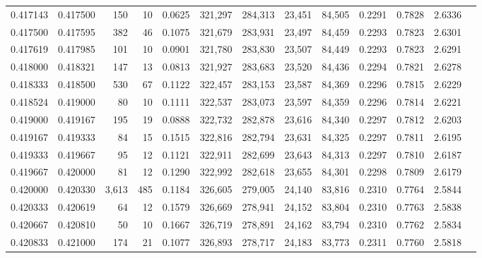 \begin{tabular}{rrrrrrrrrrrrr}
0.417143 & 0.417500 &   150 &  10 &                                     0.0625 & 321,297 & 284,313 &  23,451 &  84,505 & 0.2291 & 0.7828 & 2.6336 \\
0.417500 & 0.417595 &   382 &  46 &                                     0.1075 & 321,679 & 283,931 &  23,497 &  84,459 & 0.2293 & 0.7823 & 2.6301 \\
0.417619 & 0.417985 &   101 &  10 &                                     0.0901 & 321,780 & 283,830 &  23,507 &  84,449 & 0.2293 & 0.7823 & 2.6291 \\
0.418000 & 0.418321 &   147 &  13 &                                     0.0813 & 321,927 & 283,683 &  23,520 &  84,436 & 0.2294 & 0.7821 & 2.6278 \\
0.418333 & 0.418500 &   530 &  67 &                                     0.1122 & 322,457 & 283,153 &  23,587 &  84,369 & 0.2296 & 0.7815 & 2.6229 \\
0.418524 & 0.419000 &    80 &  10 &                                     0.1111 & 322,537 & 283,073 &  23,597 &  84,359 & 0.2296 & 0.7814 & 2.6221 \\
0.419000 & 0.419167 &   195 &  19 &                                     0.0888 & 322,732 & 282,878 &  23,616 &  84,340 & 0.2297 & 0.7812 & 2.6203 \\
0.419167 & 0.419333 &    84 &  15 &                                     0.1515 & 322,816 & 282,794 &  23,631 &  84,325 & 0.2297 & 0.7811 & 2.6195 \\
0.419333 & 0.419667 &    95 &  12 &                                     0.1121 & 322,911 & 282,699 &  23,643 &  84,313 & 0.2297 & 0.7810 & 2.6187 \\
0.419667 & 0.420000 &    81 &  12 &                                     0.1290 & 322,992 & 282,618 &  23,655 &  84,301 & 0.2298 & 0.7809 & 2.6179 \\
0.420000 & 0.420330 & 3,613 & 485 &                                     0.1184 & 326,605 & 279,005 &  24,140 &  83,816 & 0.2310 & 0.7764 & 2.5844 \\
0.420333 & 0.420619 &    64 &  12 &                                     0.1579 & 326,669 & 278,941 &  24,152 &  83,804 & 0.2310 & 0.7763 & 2.5838 \\
0.420667 & 0.420810 &    50 &  10 &                                     0.1667 & 326,719 & 278,891 &  24,162 &  83,794 & 0.2310 & 0.7762 & 2.5834 \\
0.420833 & 0.421000 &   174 &  21 &                                     0.1077 & 326,893 & 278,717 &  24,183 &  83,773 & 0.2311 & 0.7760 & 2.5818 \\

\end{tabular}
